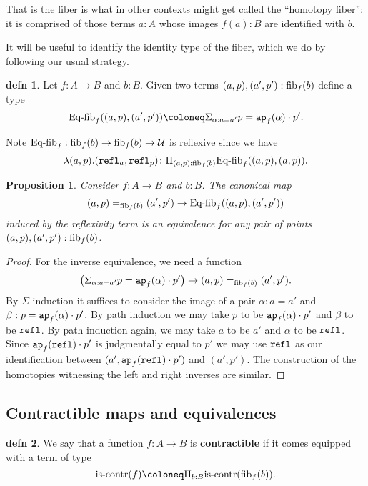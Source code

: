 \documentclass{amsart}
\theoremstyle{theorem}
\newtheorem*{prop}{Proposition}
\theoremstyle{definition}
\newtheorem*{defn}{defn}
\theoremstyle{remark}
\newcommand{\0}{\mathbbe{0}}
\newcommand{\1}{\mathbbe{1}}
\newcommand{\2}{\mathbbe{2}}
\newcommand{\3}{\mathbbe{3}}
\newcommand{\4}{\mathbbe{4}}
\newcommand{\term}[1]{{\textup{\texttt{#1}}}}
\newcommand{\type}[1]{{\textup{#1}}}
\newcommand{\refl}{\term{refl}}
\newcommand{\ap}{\term{ap}}
\newcommand{\UU}{{\mathcal{U}}}
\newcommand{\is}[1]{\type{is-{#1}}}
\newcommand{\fib}{\type{fib}}
\begin{document}
That is the fiber is what in other contexts might get called the ``homotopy fiber'': it is comprised of those terms $a:A$ whose images $f(a):B$ are identified with $b$. 

It will be useful to identify the identity type of the fiber, which we do by following our usual strategy.

\begin{defn} Let $f : A \to B$ and $b : B$. Given two terms $(a,p), (a',p') : \fib_f(b)$ define a type
\[ \type{Eq-fib}_f((a,p),(a',p')) \coloneq \Sigma_{\alpha : a = a'} p = \ap_f(\alpha) \cdot p'.\]
\end{defn}

Note $\type{Eq-fib}_f :  \fib_f(b) \to \fib_f(b) \to \UU$ is reflexive since we have
\[ \lambda(a,p). (\refl_a,\refl_p) \colon \Pi_{(a,p) :\fib_f(b)} \type{Eq-fib}_f((a,p),(a,p)).\]

\begin{prop} Consider $f \colon A \to B$ and $b :B$. The canonical map
\[ (a,p) =_{\fib_f(b)} (a',p') \to \type{Eq-fib}_f((a,p),(a',p'))\]
induced by the reflexivity term is an equivalence for any pair of points $(a,p), (a',p') : \fib_f(b)$.
\end{prop}
\begin{proof}
For the inverse equivalence, we need a function
\[ \left(\Sigma_{\alpha : a = a'} p = \ap_f(\alpha) \cdot p' \right) \to (a,p) =_{\fib_f(b)} (a',p').\]
By $\Sigma$-induction it suffices to consider the image of a pair $\alpha : a = a'$ and $\beta : p = \ap_f(\alpha) \cdot p'$. By path induction we may take $p$ to be $\ap_f(\alpha) \cdot p'$ and $\beta$ to be $\refl$. By path induction again, we may take $a$ to be $a'$ and $\alpha$ to be $\refl$. Since $\ap_f(\refl)\cdot p'$ is judgmentally equal to $p'$ we may use $\refl$ as our identification between $(a',\ap_f(\refl)\cdot p')$ and $(a',p')$. The construction of the homotopies witnessing the left and right inverses are similar.
\end{proof}


\subsection*{Contractible maps and equivalences}

\begin{defn} We say that a function $f \colon A \to B$ is \textbf{contractible} if it comes equipped with a term of type
\[ \is{contr}(f) \coloneq \Pi_{b:B} \is{contr}(\fib_f(b)).\]
\end{defn}
\end{document}
